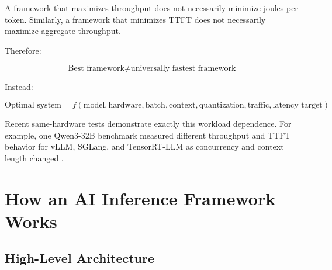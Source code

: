 \documentclass[11pt,a4paper]{article}
\begin{document}
A framework that maximizes throughput does not necessarily minimize
joules per token.  Similarly, a framework that minimizes TTFT does
not necessarily maximize aggregate throughput.

Therefore:

\[
\boxed{
\text{Best framework}
\neq
\text{universally fastest framework}
}
\]

Instead:

\[
\boxed{
\text{Optimal system}
=
f(
\text{model},
\text{hardware},
\text{batch},
\text{context},
\text{quantization},
\text{traffic},
\text{latency target}
)
}
\]

Recent same-hardware tests demonstrate exactly this workload
dependence.  For example, one Qwen3-32B benchmark measured
different throughput and TTFT behavior for vLLM, SGLang, and
TensorRT-LLM as concurrency and context length changed
\cite{benchmark2026}.

\section{How an AI Inference Framework Works}

\subsection{High-Level Architecture}
\end{document}
